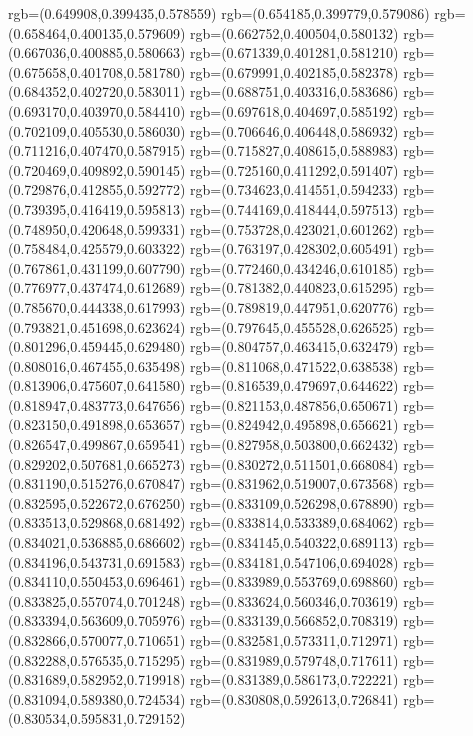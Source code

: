 {{{			rgb=(0.649908,0.399435,0.578559)
			rgb=(0.654185,0.399779,0.579086)
			rgb=(0.658464,0.400135,0.579609)
			rgb=(0.662752,0.400504,0.580132)
			rgb=(0.667036,0.400885,0.580663)
			rgb=(0.671339,0.401281,0.581210)
			rgb=(0.675658,0.401708,0.581780)
			rgb=(0.679991,0.402185,0.582378)
			rgb=(0.684352,0.402720,0.583011)
			rgb=(0.688751,0.403316,0.583686)
			rgb=(0.693170,0.403970,0.584410)
			rgb=(0.697618,0.404697,0.585192)
			rgb=(0.702109,0.405530,0.586030)
			rgb=(0.706646,0.406448,0.586932)
			rgb=(0.711216,0.407470,0.587915)
			rgb=(0.715827,0.408615,0.588983)
			rgb=(0.720469,0.409892,0.590145)
			rgb=(0.725160,0.411292,0.591407)
			rgb=(0.729876,0.412855,0.592772)
			rgb=(0.734623,0.414551,0.594233)
			rgb=(0.739395,0.416419,0.595813)
			rgb=(0.744169,0.418444,0.597513)
			rgb=(0.748950,0.420648,0.599331)
			rgb=(0.753728,0.423021,0.601262)
			rgb=(0.758484,0.425579,0.603322)
			rgb=(0.763197,0.428302,0.605491)
			rgb=(0.767861,0.431199,0.607790)
			rgb=(0.772460,0.434246,0.610185)
			rgb=(0.776977,0.437474,0.612689)
			rgb=(0.781382,0.440823,0.615295)
			rgb=(0.785670,0.444338,0.617993)
			rgb=(0.789819,0.447951,0.620776)
			rgb=(0.793821,0.451698,0.623624)
			rgb=(0.797645,0.455528,0.626525)
			rgb=(0.801296,0.459445,0.629480)
			rgb=(0.804757,0.463415,0.632479)
			rgb=(0.808016,0.467455,0.635498)
			rgb=(0.811068,0.471522,0.638538)
			rgb=(0.813906,0.475607,0.641580)
			rgb=(0.816539,0.479697,0.644622)
			rgb=(0.818947,0.483773,0.647656)
			rgb=(0.821153,0.487856,0.650671)
			rgb=(0.823150,0.491898,0.653657)
			rgb=(0.824942,0.495898,0.656621)
			rgb=(0.826547,0.499867,0.659541)
			rgb=(0.827958,0.503800,0.662432)
			rgb=(0.829202,0.507681,0.665273)
			rgb=(0.830272,0.511501,0.668084)
			rgb=(0.831190,0.515276,0.670847)
			rgb=(0.831962,0.519007,0.673568)
			rgb=(0.832595,0.522672,0.676250)
			rgb=(0.833109,0.526298,0.678890)
			rgb=(0.833513,0.529868,0.681492)
			rgb=(0.833814,0.533389,0.684062)
			rgb=(0.834021,0.536885,0.686602)
			rgb=(0.834145,0.540322,0.689113)
			rgb=(0.834196,0.543731,0.691583)
			rgb=(0.834181,0.547106,0.694028)
			rgb=(0.834110,0.550453,0.696461)
			rgb=(0.833989,0.553769,0.698860)
			rgb=(0.833825,0.557074,0.701248)
			rgb=(0.833624,0.560346,0.703619)
			rgb=(0.833394,0.563609,0.705976)
			rgb=(0.833139,0.566852,0.708319)
			rgb=(0.832866,0.570077,0.710651)
			rgb=(0.832581,0.573311,0.712971)
			rgb=(0.832288,0.576535,0.715295)
			rgb=(0.831989,0.579748,0.717611)
			rgb=(0.831689,0.582952,0.719918)
			rgb=(0.831389,0.586173,0.722221)
			rgb=(0.831094,0.589380,0.724534)
			rgb=(0.830808,0.592613,0.726841)
			rgb=(0.830534,0.595831,0.729152)
}}}
